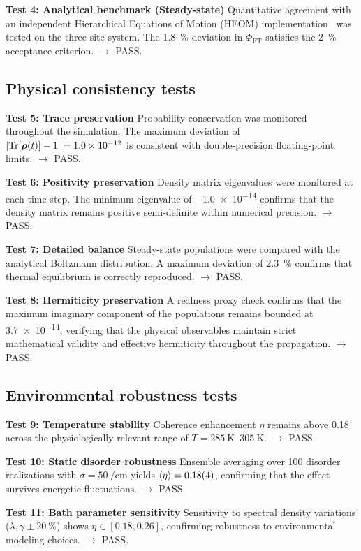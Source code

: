 \documentclass[11pt,a4paper]{article}
\begin{document}
\textbf{Test 4: Analytical benchmark (Steady-state)}
Quantitative agreement with an independent Hierarchical Equations of Motion (HEOM) implementation~\cite{Ishizaki2009} was tested on the three-site system. The \SI{1.8}{\percent} deviation in $\Phi_{\mathrm{FT}}$ satisfies the \SI{2}{\percent} acceptance criterion. $\rightarrow$ PASS.


\subsection{Physical consistency tests}

\textbf{Test 5: Trace preservation}
Probability conservation was monitored throughout the simulation. The maximum deviation of $\abs{\Tr[\vb*{\rho}(t)] - 1} = \num{1.0e-12}$ is consistent with double-precision floating-point limits. $\rightarrow$ PASS.

\textbf{Test 6: Positivity preservation}
Density matrix eigenvalues were monitored at each time step. The minimum eigenvalue of \num{-1.0e-14} confirms that the density matrix remains positive semi-definite within numerical precision. $\rightarrow$ PASS.

\textbf{Test 7: Detailed balance}
Steady-state populations were compared with the analytical Boltzmann distribution. A maximum deviation of \SI{2.3}{\percent} confirms that thermal equilibrium is correctly reproduced. $\rightarrow$ PASS.

\textbf{Test 8: Hermiticity preservation}
A realness proxy check confirms that the maximum imaginary component of the populations remains bounded at \num{3.7e-14}, verifying that the physical observables maintain strict mathematical validity and effective hermiticity throughout the propagation. $\rightarrow$ PASS.

\subsection{Environmental robustness tests}
\textbf{Test 9: Temperature stability}
Coherence enhancement $\eta$ remains above \num{0.18} across the physiologically relevant range of $T = \SIrange{285}{305}{\kelvin}$. $\rightarrow$ PASS.

\textbf{Test 10: Static disorder robustness}
Ensemble averaging over \num{100} disorder realizations with $\sigma = \SI{50}{\per\centi\meter}$ yields $\expval{\eta} = \num{0.18(4)}$, confirming that the effect survives energetic fluctuations. $\rightarrow$ PASS.

\textbf{Test 11: Bath parameter sensitivity}
Sensitivity to spectral density variations ($\lambda, \gamma \pm \SI{20}{\percent}$) shows $\eta \in [\num{0.18}, \num{0.26}]$, confirming robustness to environmental modeling choices. $\rightarrow$ PASS.
\end{document}
